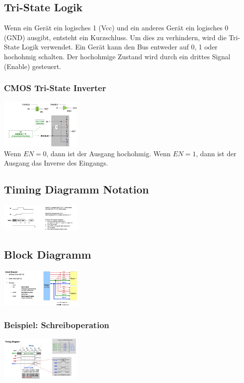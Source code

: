 \subsection{Tri-State Logik}
Wenn ein Gerät ein logisches 1 (Vcc) und ein anderes Gerät ein logisches 0 (GND) ausgibt, entsteht ein Kurzschluss. Um dies zu verhindern, wird die Tri-State Logik verwendet. Ein Gerät kann den Bus entweder auf 0, 1 oder hochohmig schalten. Der hochohmige Zustand wird durch ein drittes Signal (Enable) gesteuert.
\subsubsection{CMOS Tri-State Inverter}
\includegraphics[width=0.3\textwidth]{sections/images/cmos_tri.png}\\
Wenn $EN = 0$, dann ist der Ausgang hochohmig. Wenn $EN = 1$, dann ist der Ausgang das Inverse des Eingangs.

\subsection{Timing Diagramm Notation}
\includegraphics[width=0.3\textwidth]{sections/images/timing_diagram.png}

\subsection{Block Diagramm}
\includegraphics[width=0.3\textwidth]{sections/images/block_diagram.png}

\subsubsection{Beispiel: Schreiboperation}
\includegraphics[width=0.3\textwidth]{sections/images/schreiboperation.png}

